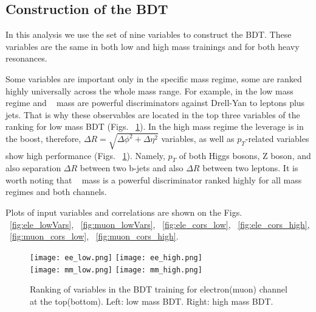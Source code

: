 \subsection{Construction of the BDT}
In this analysis we use the set of nine variables to construct the BDT. These variables are the same in both low and high mass trainings and for both heavy resonances.

Some variables are important only in the specific mass regime, some are ranked highly universally across the whole mass range. For example, in the low mass regime \ETmiss and \HBB~ mass are powerful discriminators against Drell-Yan to leptons plus jets. That is why these
observables are located in the top three variables of the ranking for low mass BDT (Figs. ~\ref{fig:ranking}). In the high mass regime the leverage is in the boost, therefore, $\Delta R = \sqrt{\Delta \phi^2 + \Delta \eta^2}$ variables, as well as $p_{T}$-related variables show high performance (Figs. ~\ref{fig:ranking}). Namely, $p_{T}$ of both Higgs bosons, Z boson, and also
separation $\Delta R $  between two b-jets and also $\Delta R$ between  two leptons. It is worth noting that \HBB~ mass is a powerful discriminator ranked highly for all mass regimes and both channels. 

Plots of input variables and correlations are shown on the Figs. ~\ref{fig:ele_lowVars}, ~\ref{fig:muon_lowVars}, ~\ref{fig:ele_cors_low}, ~\ref{fig:ele_cors_high}, ~\ref{fig:muon_cors_low}, ~\ref{fig:muon_cors_high}.

\begin{figure}[tbp]
  \begin{center}
   \texttt{[image: ee\_low.png]}
   \texttt{[image: ee\_high.png]}\\
   \texttt{[image: mm\_low.png]}
   \texttt{[image: mm\_high.png]}
    \caption{ Ranking of variables in the BDT training for electron(muon) channel at the top(bottom). Left: low mass BDT. Right: high mass BDT.}
    \label{fig:ranking}
  \end{center}
\end{figure}



